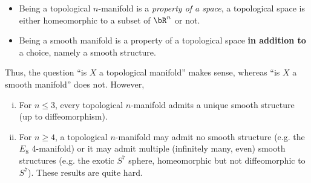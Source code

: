 \begin{rmk}\label{rmk:top-vs-smooth-manifold}$ $
	\begin{itemize}
		\item Being a topological $n$-manifold is a \emph{property of a space}, a topological space is either homeomorphic to a subset of $\bR^n$ or not.
		\item Being a smooth manifold is a property of a topological space \textbf{in addition to} a choice, namely a smooth structure.
	\end{itemize}
	Thus, the question ``is $X$ a topological manifold'' makes sense, whereas ``is $X$ a smooth manifold'' does not. However,
	\begin{enumerate}[(i)]
		\item For $n \leq 3$, every topological $n$-manifold admits a unique smooth structure (up to diffeomorphism).
		\item For $n \geq 4$, a topological $n$-manifold may admit no smooth structure (e.g. the $E_8$ 4-manifold) or it may admit multiple (infinitely many, even) smooth structures (e.g. the exotic $S^7$ sphere, homeomorphic but not diffeomorphic to $S^7$). These results are quite hard.
	\end{enumerate}
\end{rmk}



